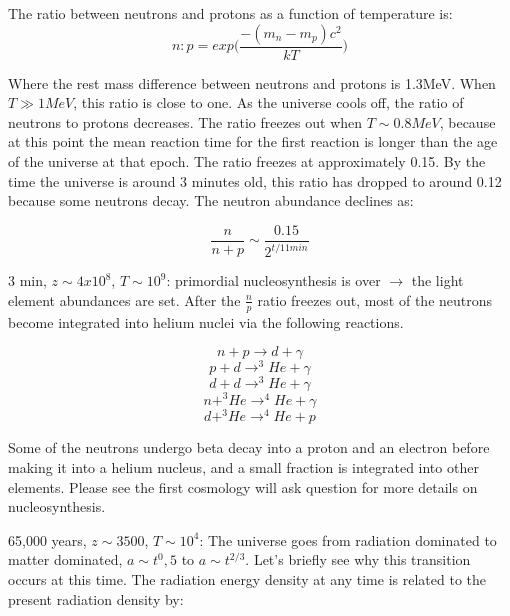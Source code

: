 \begin{enumerate}
The ratio between neutrons and protons as a function of temperature is:
\begin{equation}
n:p = exp\bigg(\frac{-(m_n - m_p)c^2}{kT}\bigg)
\end{equation}

Where the rest mass difference between neutrons and protons is 1.3MeV.  When $T \gg 1MeV$, this ratio is close to one.  As the universe cools off, the ratio of neutrons to protons decreases.  The ratio freezes out when $T \sim 0.8MeV$, because at this point the mean reaction time for the first reaction is longer than the age of the universe at that epoch.  The ratio freezes at approximately 0.15.  By the time the universe is around 3 minutes old, this ratio has dropped to around 0.12 because some neutrons decay.  The neutron abundance declines as:

\begin{equation}
\frac{n}{n+p} \sim \frac{0.15}{2^{t/11 min}}
\end{equation}

3 min, $z \sim 4x10^8$, $T \sim 10^9$:  primordial nucleosynthesis is over $\rightarrow$ the light element abundances are set.  After the $\frac{n}{p}$ ratio freezes out, most of the neutrons become integrated into helium nuclei via the following reactions.

\begin{equation}
n + p \rightarrow d + \gamma
\end{equation}
\begin{equation}
p + d \rightarrow ^3He + \gamma
\end{equation}
\begin{equation}
d + d \rightarrow ^3He + \gamma
\end{equation}
\begin{equation}
n + ^3He \rightarrow ^4He + \gamma
\end{equation}
\begin{equation}
d + ^3He \rightarrow ^4He + p
\end{equation}

Some of the neutrons undergo beta decay into a proton and an electron before making it into a helium nucleus, and a small fraction is integrated into other elements.  Please see the first cosmology will ask question for more details on nucleosynthesis.

65,000 years, $z \sim 3500$, $T \sim 10^4$:  The universe goes from radiation dominated to matter dominated, $a \sim t^0,5$ to $a \sim t^{2/3}$.  Let's briefly see why this transition occurs at this time.  The radiation energy density at any time is related to the present radiation density by:


\end{enumerate}
